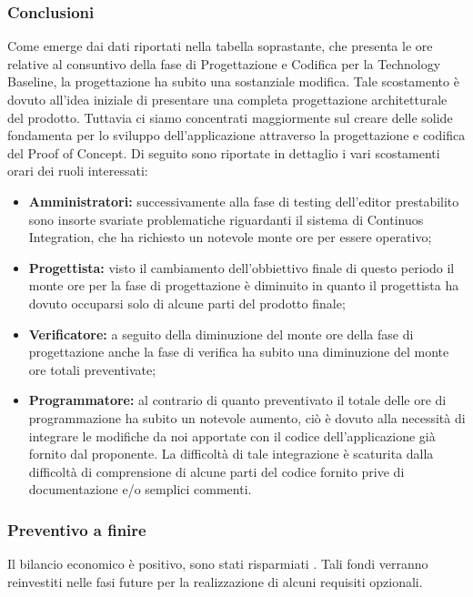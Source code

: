 \subsubsection{Conclusioni}
Come emerge dai dati riportati nella tabella soprastante, che presenta le ore relative al consuntivo della fase di Progettazione e Codifica per la Technology Baseline, la progettazione ha subito una sostanziale modifica. Tale scostamento è dovuto all'idea iniziale di presentare una completa progettazione architetturale del prodotto. Tuttavia ci siamo concentrati maggiormente sul creare delle solide fondamenta per lo sviluppo dell'applicazione attraverso la progettazione e codifica del Proof of Concept\glo. Di seguito sono riportate in dettaglio i vari scostamenti orari dei ruoli interessati:
\begin{itemize}
\item \textbf{Amministratori:} successivamente alla fase di testing dell'editor prestabilito sono insorte svariate problematiche riguardanti il sistema di Continuos Integration\glo, che ha richiesto un notevole monte ore per essere operativo;
\item \textbf{Progettista:} visto il cambiamento dell'obbiettivo finale di questo periodo il monte ore per la fase di progettazione è diminuito in quanto il progettista ha dovuto occuparsi solo di alcune parti del prodotto finale; 
\item \textbf{Verificatore:} a seguito della diminuzione del monte ore della fase di progettazione anche la fase di verifica ha subito una diminuzione del monte ore totali preventivate;
\item \textbf{Programmatore:} al contrario di quanto preventivato il totale delle ore di programmazione ha subito un notevole aumento, ciò è dovuto alla necessità di integrare le modifiche da noi apportate con il codice dell'applicazione già fornito dal proponente. La difficoltà di tale integrazione è scaturita dalla difficoltà di comprensione di alcune parti del codice fornito prive di documentazione e/o semplici commenti.
\end{itemize}

\subsubsection{Preventivo a finire}
Il bilancio economico è positivo, sono stati risparmiati . Tali fondi verranno reinvestiti nelle fasi future per la realizzazione di alcuni requisiti opzionali.
